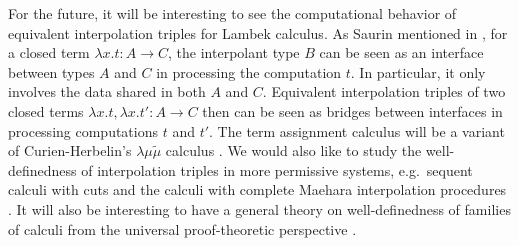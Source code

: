\documentclass[a4paper,UKenglish,cleveref,autoref,thm-restate, anonymous]{lipics-v2021}
\newcommand{\Gl}{\lambda}
\begin{document}
For the future, it will be interesting to see the computational behavior of equivalent interpolation triples for Lambek calculus.
As Saurin mentioned in \cite{Saurin2024}, for a closed term $\Gl x.t : A \to C$, the interpolant type $B$ can be seen as an interface between types $A$ and $C$ in processing the computation $t$.
In particular, it only involves the data shared in both $A$ and $C$.
Equivalent interpolation triples of two closed terms $\Gl x.t,\Gl x. t' : A \to C$ then can be seen as bridges between interfaces in processing computations $t$ and $t'$.
The term assignment calculus will be a variant of Curien-Herbelin's $\lambda\mu\tilde{\mu} $ calculus \cite{Curien2000}.
We would also like to study the well-definedness of interpolation triples in more permissive systems, e.g.\ sequent calculi with cuts \cite{Saurin2025} and the calculi with complete Maehara interpolation procedures \cite{Hetzl2024}.
It will also be interesting to have a general theory on well-definedness of families of calculi from the universal proof-theoretic perspective \cite{tabatabai2018,Tabatabai2025}.




\end{document}
